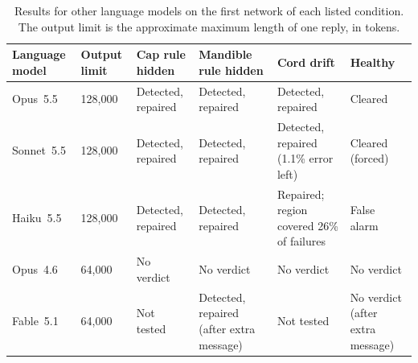 \documentclass[aps,prx,reprint,superscriptaddress,nofootinbib]{revtex4-2}
\newlength{\tblw}
\begin{document}
\begin{table}[tp]
\caption{Results for other language models on the first network of each listed condition. The output limit is
the approximate maximum length of one reply, in tokens.}\label{tbl:models}
\small
\setlength{\tabcolsep}{6pt}
\setlength{\tblw}{\dimexpr\hsize-12\tabcolsep\relax}
\begin{ruledtabular}
\begin{tabular}{llllll}
\parbox[b]{0.0918\tblw}{\raggedright\strut Language model\strut} & \parbox[b]{0.0699\tblw}{\raggedright\strut Output limit\strut} & \parbox[b]{0.1575\tblw}{\raggedright\strut Cap rule hidden\strut} & \parbox[b]{0.1806\tblw}{\raggedright\strut Mandible rule hidden\strut} & \parbox[b]{0.3560\tblw}{\raggedright\strut Cord drift\strut} & \parbox[b]{0.1440\tblw}{\raggedright\strut Healthy\strut} \\
\hline
\parbox[t]{0.0918\tblw}{\raggedright\strut Opus~5.5\strut} & \parbox[t]{0.0699\tblw}{\raggedright\strut 128,000\strut} & \parbox[t]{0.1575\tblw}{\raggedright\strut Detected, repaired\strut} & \parbox[t]{0.1806\tblw}{\raggedright\strut Detected, repaired\strut} & \parbox[t]{0.3560\tblw}{\raggedright\strut Detected, repaired\strut} & \parbox[t]{0.1440\tblw}{\raggedright\strut Cleared\strut} \\
\parbox[t]{0.0918\tblw}{\raggedright\strut Sonnet~5.5\strut} & \parbox[t]{0.0699\tblw}{\raggedright\strut 128,000\strut} & \parbox[t]{0.1575\tblw}{\raggedright\strut Detected, repaired\strut} & \parbox[t]{0.1806\tblw}{\raggedright\strut Detected, repaired\strut} & \parbox[t]{0.3560\tblw}{\raggedright\strut Detected, repaired (1.1\% error left)\strut} & \parbox[t]{0.1440\tblw}{\raggedright\strut Cleared (forced)\strut} \\
\parbox[t]{0.0918\tblw}{\raggedright\strut Haiku~5.5\strut} & \parbox[t]{0.0699\tblw}{\raggedright\strut 128,000\strut} & \parbox[t]{0.1575\tblw}{\raggedright\strut Detected, repaired\strut} & \parbox[t]{0.1806\tblw}{\raggedright\strut Detected, repaired\strut} & \parbox[t]{0.3560\tblw}{\raggedright\strut Repaired; region covered 26\% of failures\strut} & \parbox[t]{0.1440\tblw}{\raggedright\strut False alarm\strut} \\
\parbox[t]{0.0918\tblw}{\raggedright\strut Opus~4.6\strut} & \parbox[t]{0.0699\tblw}{\raggedright\strut 64,000\strut} & \parbox[t]{0.1575\tblw}{\raggedright\strut No verdict\strut} & \parbox[t]{0.1806\tblw}{\raggedright\strut No verdict\strut} & \parbox[t]{0.3560\tblw}{\raggedright\strut No verdict\strut} & \parbox[t]{0.1440\tblw}{\raggedright\strut No verdict\strut} \\
\parbox[t]{0.0918\tblw}{\raggedright\strut Fable~5.1\strut} & \parbox[t]{0.0699\tblw}{\raggedright\strut 64,000\strut} & \parbox[t]{0.1575\tblw}{\raggedright\strut Not tested\strut} & \parbox[t]{0.1806\tblw}{\raggedright\strut Detected, repaired (after extra message)\strut} & \parbox[t]{0.3560\tblw}{\raggedright\strut Not tested\strut} & \parbox[t]{0.1440\tblw}{\raggedright\strut No verdict (after extra message)\strut} \\
\end{tabular}
\end{ruledtabular}
\end{table}
\end{document}
